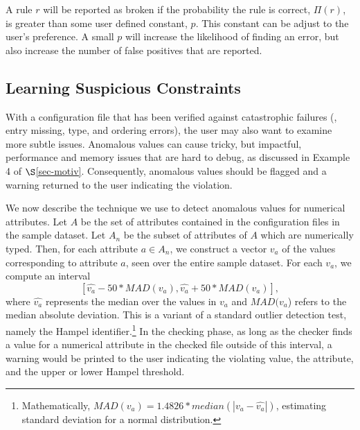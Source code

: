 

A rule $r$ will be reported as broken if the probability the rule is
correct, $\Pi(r)$, is greater than some user defined constant, $p$. This
constant can be adjust to the user's preference. A small $p$ will
increase the likelihood of finding an error, but also increase the
number of false positives that are reported.

\subsection{Learning Suspicious Constraints}
\label{subsec-constraints}

With a configuration file that has been verified against catastrophic
failures (\eg, entry missing, type, and ordering errors), 
the user may also want to examine more subtle issues.
Anomalous values can cause tricky, but impactful, performance and memory
issues that are hard to debug, as discussed in Example 4 of 
$\S$\ref{sec-motiv}. 
Consequently, anomalous values should be flagged and a warning returned
to the user indicating the violation.

We now describe the technique we use to detect anomalous values for 
numerical attributes. Let $A$ be the set of attributes contained in the 
configuration files in the sample dataset. 
Let $A_n$ be the subset of attributes of $A$ which are numerically typed. 
Then, for each attribute $a \in A_n$, we construct a vector $v_a$ of the 
values corresponding to attribute $a$, seen over the entire sample dataset.
For each $v_a$, we compute 
an interval  $$[\hat{v_a} - 50*MAD(v_a), \hat{v_a} + 50*MAD(v_a)],$$ 
where $\hat{v_a}$ represents the median over the values 
in $v_a$ and $MAD(v_a$) refers to the 
median absolute deviation. 
This is a variant of a standard outlier detection test, namely the Hampel identifier.\footnote{Mathematically, $MAD(v_a) = 1.4826* median(|v_a - \hat{v_a}|)$, estimating standard deviation 
for a normal distribution.} 
In the checking phase, as long as the checker finds a value for a numerical 
attribute in the checked file outside of this interval, 
a warning would be printed to the user indicating the violating value, 
the attribute, and the upper or lower Hampel threshold. 

